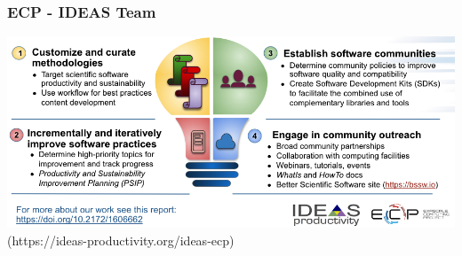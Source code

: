 \begin{frame}\frametitle{ECP - IDEAS Team}
\begin{center}
\includegraphics[width=\textwidth]{figures/ideas.png}\\
(https://ideas-productivity.org/ideas-ecp)
\end{center}
\end{frame}

